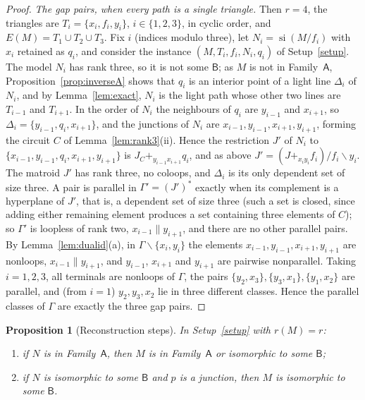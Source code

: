 \documentclass[11pt]{amsart}
\newtheorem{proposition}[theorem]{Proposition}
\theoremstyle{definition}
\theoremstyle{remark}
\numberwithin{equation}{section}
\newcommand{\si}{\operatorname{si}}
\newcommand{\FA}{\mathsf{A}}
\newcommand{\FB}{\mathsf{B}}
\begin{document}
\begin{proof}
\emph{The gap pairs, when every path is a single triangle.} Then $r=4$, the triangles are $T_i=\{x_i,f_i,y_i\}$, $i\in\{1,2,3\}$, in cyclic order, and $E(M)=T_1\cup T_2\cup T_3$. Fix $i$ (indices modulo three), let $N_i=\si(M/f_i)$ with $x_i$ retained as $q_i$, and consider the instance $(M,T_i,f_i,N_i,q_i)$ of Setup~\ref{setup}. The model $N_i$ has rank three, so it is not some $\FB$; as $M$ is not in Family~$\FA$, Proposition~\ref{prop:inverseA} shows that $q_i$ is an interior point of a light line $\Delta_i$ of $N_i$, and by Lemma~\ref{lem:exact}, $N_i$ is the light path whose other two lines are $T_{i-1}$ and $T_{i+1}$. In the order of $N_i$ the neighbours of $q_i$ are $y_{i-1}$ and $x_{i+1}$, so $\Delta_i=\{y_{i-1},q_i,x_{i+1}\}$, and the junctions of $N_i$ are $x_{i-1},y_{i-1},x_{i+1},y_{i+1}$, forming the circuit $C$ of Lemma~\ref{lem:rank3}(ii). Hence the restriction $J'$ of $N_i$ to $\{x_{i-1},y_{i-1},q_i,x_{i+1},y_{i+1}\}$ is $J_C+_{y_{i-1}x_{i+1}}q_i$, and as above $J'=(J+_{x_iy_i}f_i)/f_i\backslash y_i$. The matroid $J'$ has rank three, no coloops, and $\Delta_i$ is its only dependent set of size three. A pair is parallel in $\Gamma'=(J')^*$ exactly when its complement is a hyperplane of $J'$, that is, a dependent set of size three (such a set is closed, since adding either remaining element produces a set containing three elements of $C$); so $\Gamma'$ is loopless of rank two, $x_{i-1}\parallel y_{i+1}$, and there are no other parallel pairs. By Lemma~\ref{lem:dualid}(a), in $\Gamma\backslash\{x_i,y_i\}$ the elements $x_{i-1},y_{i-1},x_{i+1},y_{i+1}$ are nonloops, $x_{i-1}\parallel y_{i+1}$, and $y_{i-1}$, $x_{i+1}$ and $y_{i+1}$ are pairwise nonparallel. Taking $i=1,2,3$, all terminals are nonloops of $\Gamma$, the pairs $\{y_2,x_3\},\{y_3,x_1\},\{y_1,x_2\}$ are parallel, and (from $i=1$) $y_2,y_3,x_2$ lie in three different classes. Hence the parallel classes of $\Gamma$ are exactly the three gap pairs.
\end{proof}

\begin{proposition}[Reconstruction steps]\label{prop:inverse4}
In Setup~\textup{\ref{setup}} with $r(M)=r$:
\begin{enumerate}[label=\textup{(\alph*)}]
\item if $N$ is in Family~$\FA$, then $M$ is in Family~$\FA$ or isomorphic to some $\FB$;
\item if $N$ is isomorphic to some $\FB$ and $p$ is a junction, then $M$ is isomorphic to some $\FB$.
\end{enumerate}
\end{proposition}
\end{document}
